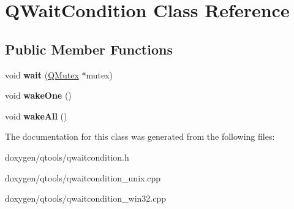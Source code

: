 \hypertarget{class_q_wait_condition}{}\section{Q\+Wait\+Condition Class Reference}
\label{class_q_wait_condition}
\subsection*{Public Member Functions}
\begin{DoxyCompactItemize}
\item 
\mbox{\label{class_q_wait_condition_a69eabb0e192c07a286c72aa08e2f7d2b}} 
void {\bfseries wait} (\mbox{\hyperlink{class_q_mutex}{Q\+Mutex}} $\ast$mutex)
\item 
\mbox{\label{class_q_wait_condition_acd08824073502082eadb823cb5b9e309}} 
void {\bfseries wake\+One} ()
\item 
\mbox{\label{class_q_wait_condition_a9c815228d28c49d50fc58ff4e53a323a}} 
void {\bfseries wake\+All} ()
\end{DoxyCompactItemize}


The documentation for this class was generated from the following files\+:\begin{DoxyCompactItemize}
\item 
doxygen/qtools/qwaitcondition.\+h\item 
doxygen/qtools/qwaitcondition\+\_\+unix.\+cpp\item 
doxygen/qtools/qwaitcondition\+\_\+win32.\+cpp\end{DoxyCompactItemize}
